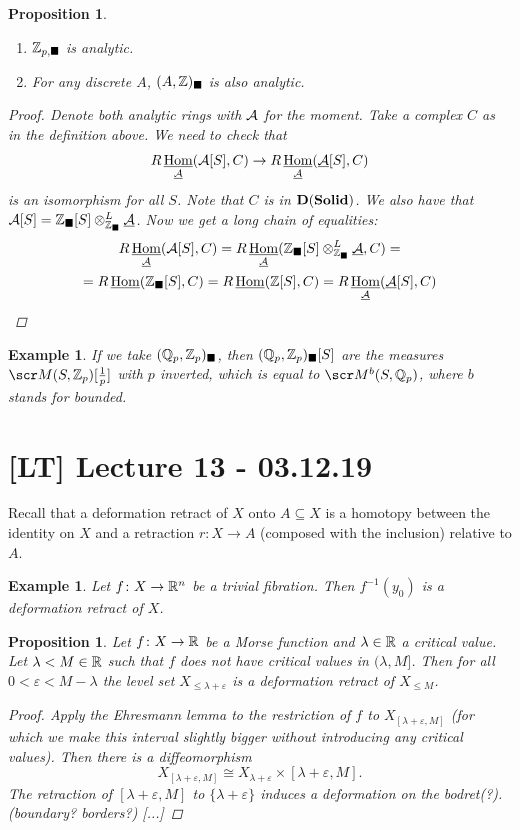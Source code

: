 \documentclass[A4paper, british]{amsart}
\theoremstyle{darkgreentheorem}
\newtheorem{prop}[thm]{Proposition}
\theoremstyle{darkbluedefinition}
\theoremstyle{darkredexample}
\newtheorem{exa}[thm]{Example}
\theoremstyle{remark}
\DeclareMathOperator{\ihom}{\underline{Hom}}
\newcommand{\Solid}{\mathbf{Solid}}
\newcommand{\1}{\mathbbm{1}}
\renewcommand{\u}[1]{\underline{#1}}
\newcommand{\ot}{\otimes}
\newcommand{\sub}{\subseteq}
\newcommand{\usolid}{_{\blacksquare}}
\begin{document}
\begin{prop}
    \begin{enumerate}[label=\roman*)]
	\item $\mathbb{Z}_{p,\blacksquare}$ is analytic.
	\item For any discrete $A$, $(A,\Z)\usolid$ is also analytic.
    \end{enumerate}
    \begin{proof}
	Denote both analytic rings with $\mathcal{A}$ for the moment.
	Take a complex $C$ as in the definition above.
	We need to check that
	\[ R\ihom_{\u{\calA}}(\calA[S],C)\to R\ihom_{\u{\calA}}(\u{\calA}[S],C) \]
	is an isomorphism for all $S$.
	Note that $C$ is in $\D(\Solid)$.
	We also have that $\calA[S]=\Z\usolid[S]\ot_{\Z\usolid}^{L}\u{\calA}$.
	Now we get a long chain of equalities:
	\begin{multline*}
	    R\ihom_{\u\calA}(\calA[S],C)=R\ihom_{\u{\calA}}(\Z\usolid[S]\ot_{\Z\usolid}^{L}\u{\calA},C)= \\
	    = R\ihom(\Z\usolid[S],C) = R\ihom(\Z[S],C)=R\ihom_{\u{\calA}}(\u{\calA}[S],C) 
	\end{multline*}
    \end{proof}
\end{prop}

\begin{exa}
    If we take $(\Q_{p},\Z_{p})\usolid$, then $(\Q_{p},\Z_{p})\usolid[S]$ are the measures $\M(S,\Z_{p})[\frac{1}{p}]$ with $p$ inverted, which is equal to $\M^{b}(S,\Q_{p})$, where $b$ stands for bounded.
\end{exa}

\section{[LT] Lecture 13 - 03.12.19}

Recall that a deformation retract of $X$ onto $A\sub X$ is a homotopy between the identity on $X$ and a retraction $r\colon X\to A$ (composed with the inclusion) relative to $A$.

\begin{exa}
    Let $f\colon X\to \mathbb{R}^{n}$ be a trivial fibration.
    Then $f^{-1}(y_{0})$ is a deformation retract of $X$.
\end{exa}

\begin{prop}
    Let $f\colon X\to \mathbb{R}$ be a Morse function and $\lambda\in \mathbb{R}$ a critical value.
    Let $\lambda<M\in \mathbb{R}$ such that $f$ does not have critical values in $(\lambda,M]$.
    Then for all $0<\varepsilon <M-\lambda$ the level set $X_{\leqslant \lambda +\varepsilon }$ is a deformation retract of $X_{\leqslant M}$.
    \begin{proof}
	Apply the Ehresmann lemma to the restriction of $f$ to $X_{[\lambda+\varepsilon, M]}$ (for which we make this interval slightly bigger without introducing any critical values).
	Then there is a diffeomorphism
	\[ X_{[\lambda+\varepsilon, M]}\cong X_{\lambda+\varepsilon}\times [\lambda+\varepsilon, M]. \]
	The retraction of $[\lambda+\varepsilon,M]$ to $\{\lambda +\varepsilon\}$ induces a deformation on the bodret(?).(boundary? borders?)
	[...]
    \end{proof}
\end{prop}
\end{document}
